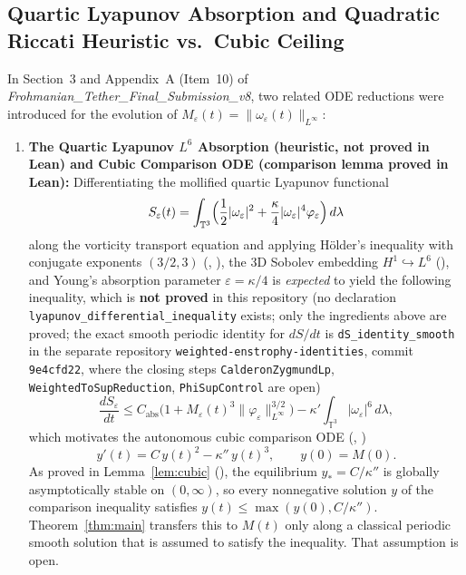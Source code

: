 \documentclass[11pt,a4paper]{article}
\theoremstyle{plain}
\theoremstyle{definition}
\theoremstyle{remark}
\newcommand{\T}{\mathbb{T}^3}
\begin{document}
\subsection{Quartic Lyapunov Absorption and Quadratic Riccati Heuristic vs.\ Cubic Ceiling}
In Section~3 and Appendix~A (Item~10) of \emph{Frohmanian\_Tether\_Final\_Submission\_v8}, two related ODE reductions were introduced for the evolution of $M_\varepsilon(t)=\|\omega_\varepsilon(t)\|_{L^\infty}$:
\begin{enumerate}
\item \textbf{The Quartic Lyapunov $L^6$ Absorption (heuristic, not proved in Lean) and Cubic Comparison ODE (comparison lemma proved in Lean):}
Differentiating the mollified quartic Lyapunov functional
\[
S_\varepsilon(t)=\int_{\T}\Bigl(\frac12|\omega_\varepsilon|^2+\frac{\kappa}{4}|\omega_\varepsilon|^4\varphi_\varepsilon\Bigr)\,d\lambda
\]
along the vorticity transport equation and applying Hölder's inequality with conjugate exponents $(3/2,3)$ (, ), the 3D Sobolev embedding $H^1\hookrightarrow L^6$ (), and Young's absorption parameter $\varepsilon=\kappa/4$ is \emph{expected} to yield the following inequality, which is \textbf{not proved} in this repository (no declaration \texttt{lyapunov\_differential\_inequality} exists; only the ingredients above are proved; the exact smooth periodic identity for $dS/dt$ is \texttt{dS\_identity\_smooth} in the separate repository \texttt{weighted-enstrophy-identities}, commit \texttt{9e4cfd22}, where the closing steps \texttt{CalderonZygmundLp}, \texttt{WeightedToSupReduction}, \texttt{PhiSupControl} are open)
\begin{equation}\label{eq:orig_dS}
\frac{dS_\varepsilon}{dt}\le C_{\mathrm{abs}}\bigl(1+M_\varepsilon(t)^3\|\varphi_\varepsilon\|_{L^\infty}^{3/2}\bigr)-\kappa'\int_{\T}|\omega_\varepsilon|^6\,d\lambda,
\end{equation}
which motivates the autonomous cubic comparison ODE (, )
\begin{equation}\label{eq:orig_cubic_ode}
y'(t) = C\,y(t)^2 - \kappa''\,y(t)^3,\qquad y(0)=M(0).
\end{equation}
As proved in Lemma~\ref{lem:cubic} (), the equilibrium $y_*=C/\kappa''$ is globally asymptotically stable on $(0,\infty)$, so every nonnegative solution $y$ of the comparison inequality satisfies $y(t)\le\max(y(0),C/\kappa'')$. Theorem~\ref{thm:main} transfers this to $M(t)$ only along a classical periodic smooth solution that is assumed to satisfy the inequality. That assumption is open.

\end{enumerate}
\end{document}
